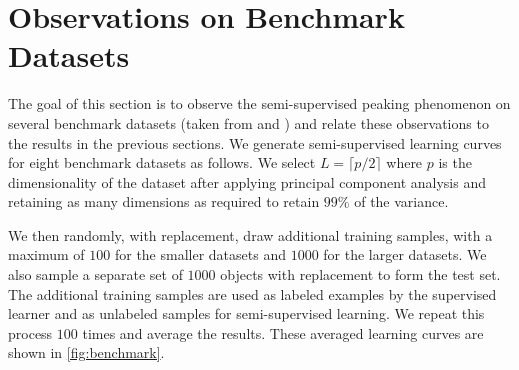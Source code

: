 \documentclass[twoside]{memoir}\usepackage[]{graphicx}\usepackage{xcolor}
\renewcommand{\cite}{\citep}
\begin{document}
\section{Observations on Benchmark Datasets}
The goal of this section is to observe the semi-supervised peaking phenomenon on several benchmark datasets (taken from \cite{Chapelle2006} and \cite{Lichman2013}) and relate these observations to the results in the previous sections. We generate semi-supervised learning curves for eight benchmark datasets as follows. We select $L=\lceil p/2 \rceil$ where $p$ is the dimensionality of the dataset after applying principal component analysis and retaining as many dimensions as required to retain $99\%$ of the variance. 

We then randomly, with replacement, draw additional training samples, with a maximum of $100$ for the smaller datasets and $1000$ for the larger datasets. We also sample a separate set of $1000$ objects with replacement to form the test set. The additional training samples are used as labeled examples by the supervised learner and as unlabeled samples for semi-supervised learning. We repeat this process $100$ times and average the results. These averaged learning curves are shown in \cref{fig:benchmark}.
\end{document}

